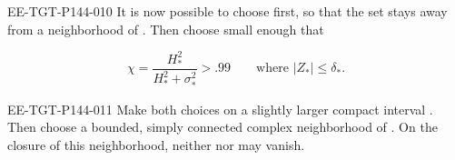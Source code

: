 \begin{EESegment}{EE-TGT-P144-010}
It is now possible to choose  first, so that the set
 stays away from a neighborhood of
. Then choose  small enough that
\end{EESegment}
\begin{equation}
  \chi=\frac{H_*^2}{H_*^2+\sigma_*^2}>.99
  \qquad\text{where }|Z_*|\leq\delta_*.
  \tag{B.2}\label{eq:B.2}
\end{equation}
\begin{EESegment}{EE-TGT-P144-011}
Make both choices on a slightly larger compact interval . Then choose a bounded,
simply connected complex neighborhood  of . On the closure of
this neighborhood, neither  nor  may vanish.
\end{EESegment}
